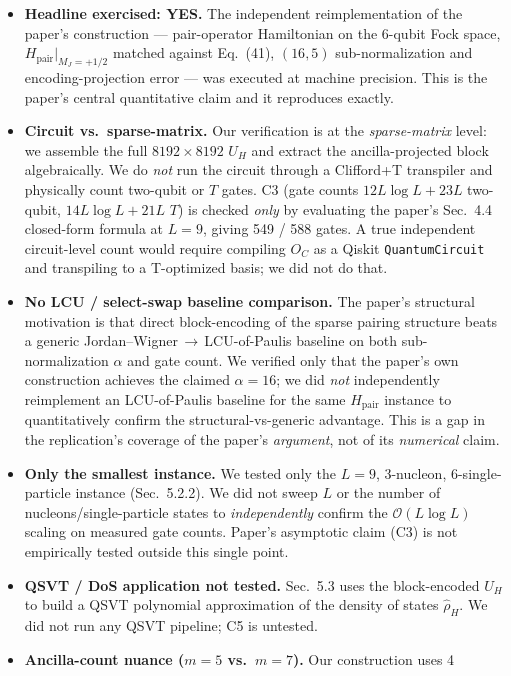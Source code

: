 \documentclass[11pt]{article}
\begin{document}
\begin{itemize}
\item \textbf{Headline exercised: YES.} The independent reimplementation of the
paper's construction --- pair-operator Hamiltonian on the 6-qubit Fock space,
$H_{\text{pair}}|_{M_J=+1/2}$ matched against Eq.~(41), $(16,5)$ sub-normalization
and encoding-projection error --- was executed at machine precision. This is
the paper's central quantitative claim and it reproduces exactly.
\item \textbf{Circuit vs.\ sparse-matrix.} Our verification is at the
\emph{sparse-matrix} level: we assemble the full $8192\times 8192$ $U_H$ and
extract the ancilla-projected block algebraically. We do \emph{not} run the
circuit through a Clifford+T transpiler and physically count two-qubit or $T$
gates. C3 (gate counts $12L\log L + 23L$ two-qubit, $14L\log L + 21L$ $T$) is
checked \emph{only} by evaluating the paper's Sec.~4.4 closed-form formula at
$L=9$, giving 549 / 588 gates. A true independent circuit-level count would
require compiling $O_C$ as a Qiskit \texttt{QuantumCircuit} and transpiling
to a T-optimized basis; we did not do that.
\item \textbf{No LCU / select-swap baseline comparison.} The paper's structural
motivation is that direct block-encoding of the sparse pairing structure beats
a generic Jordan--Wigner\,$\to$\,LCU-of-Paulis baseline on both sub-normalization
$\alpha$ and gate count. We verified only that the paper's own construction
achieves the claimed $\alpha=16$; we did \emph{not} independently reimplement
an LCU-of-Paulis baseline for the same $H_{\text{pair}}$ instance to
quantitatively confirm the structural-vs-generic advantage. This is a
gap in the replication's coverage of the paper's \emph{argument}, not of its
\emph{numerical} claim.
\item \textbf{Only the smallest instance.} We tested only the $L{=}9$, 3-nucleon,
6-single-particle instance (Sec.~5.2.2). We did not sweep $L$ or the number of
nucleons/single-particle states to \emph{independently} confirm the
$\mathcal{O}(L\log L)$ scaling on measured gate counts. Paper's asymptotic
claim (C3) is not empirically tested outside this single point.
\item \textbf{QSVT / DoS application not tested.} Sec.~5.3 uses the block-encoded
$U_H$ to build a QSVT polynomial approximation of the density of states
$\hat\rho_H$. We did not run any QSVT pipeline; C5 is untested.
\item \textbf{Ancilla-count nuance ($m=5$ vs.\ $m=7$).} Our construction uses 4

\end{itemize}
\end{document}
